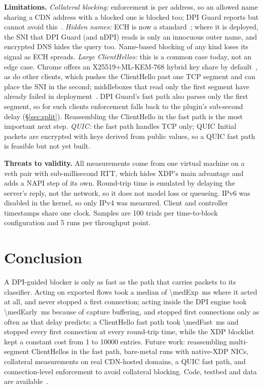 \documentclass[sigconf,nonacm]{acmart}
\newcommand{\sys}{DPI Guard}
\begin{document}
\textbf{Limitations.} \emph{Collateral blocking:} enforcement is per address, so an allowed
name sharing a CDN address with a blocked one is blocked too; \sys{} reports but cannot avoid
this~\cite{hoang}. \emph{Hidden names:} ECH is now a standard~\cite{ech,svcbech}; where it is
deployed, the SNI that \sys{} (and nDPI) reads is only an innocuous outer name, and encrypted
DNS hides the query too. Name-based blocking of any kind loses its signal as ECH spreads.
\emph{Large ClientHellos:} this is a common case today, not an edge case. Chrome offers an
X25519+ML-KEM-768 hybrid key share by default~\cite{chromemlkem}, as do other clients, which
pushes the ClientHello past one TCP segment and can place the SNI in the second; middleboxes
that read only the first segment have already failed in deployment~\cite{traefikpq,traefikcve}.
\sys{}'s fast path also parses only the first segment, so for such clients enforcement falls
back to the plugin's sub-second delay (\S\ref{sec:split}). Reassembling the ClientHello in the
fast path is the most important next step. \emph{QUIC:} the fast path handles TCP only; QUIC Initial packets are encrypted with
keys derived from public values, so a QUIC fast path is feasible but not yet built.

\textbf{Threats to validity.} All measurements come from one virtual machine on a veth pair
with sub-millisecond RTT, which hides XDP's main advantage and adds a NAPI step of its own. Round-trip
time is emulated by delaying the server's reply, not the network, so it does not model loss or
queueing. IPv6 was disabled in the kernel, so only IPv4 was measured. Client and controller
timestamps share one clock. Samples are 100 trials per time-to-block configuration and 5 runs
per throughput point.

\section{Conclusion}

A DPI-guided blocker is only as fast as the path that carries packets to its classifier.
Acting on exported flows took a median of \SI{\medExp}{\milli\second} where it acted at all,
and never stopped a first connection;
acting inside the DPI engine took \SI{\medEarly}{\milli\second} because of capture buffering,
and stopped first connections only as often as that delay predicts; a ClientHello fast path
took \SI{\medFast}{\milli\second} and stopped every first connection at every round-trip time,
while the XDP blocklist kept a constant cost from 1 to \num{10000} entries. Future work:
reassembling multi-segment ClientHellos in the fast path, bare-metal runs with native-XDP NICs,
collateral measurements on real CDN-hosted domains, a QUIC fast path, and connection-level
enforcement to avoid collateral blocking. Code, testbed and data are available~\cite{dpiguard}.



\end{document}
